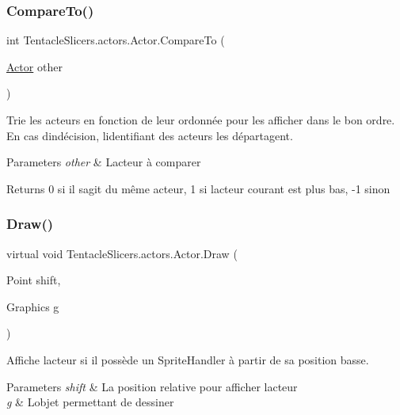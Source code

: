 \subsubsection{\texorpdfstring{Compare\+To()}{CompareTo()}}
{\footnotesize\ttfamily int Tentacle\+Slicers.\+actors.\+Actor.\+Compare\+To (\begin{DoxyParamCaption}\item[{\hyperlink{class_tentacle_slicers_1_1actors_1_1_actor}{Actor}}]{other }\end{DoxyParamCaption})}



Trie les acteurs en fonction de leur ordonnée pour les afficher dans le bon ordre. En cas d\textquotesingle{}indécision, l\textquotesingle{}identifiant des acteurs les départagent. 


\begin{DoxyParams}{Parameters}
{\em other} & L\textquotesingle{}acteur à comparer \\
\hline
\end{DoxyParams}
\begin{DoxyReturn}{Returns}
0 si il s\textquotesingle{}agit du même acteur, 1 si l\textquotesingle{}acteur courant est plus bas, -\/1 sinon 
\end{DoxyReturn}
\mbox{\label{class_tentacle_slicers_1_1actors_1_1_actor_ae06facc411c8cd44596e59020d131dd7}} 
\subsubsection{\texorpdfstring{Draw()}{Draw()}}
{\footnotesize\ttfamily virtual void Tentacle\+Slicers.\+actors.\+Actor.\+Draw (\begin{DoxyParamCaption}\item[{Point}]{shift,  }\item[{Graphics}]{g }\end{DoxyParamCaption})\hspace{0.3cm}{\ttfamily [virtual]}}



Affiche l\textquotesingle{}acteur si il possède un Sprite\+Handler à partir de sa position basse. 


\begin{DoxyParams}{Parameters}
{\em shift} & La position relative pour afficher l\textquotesingle{}acteur \\
\hline
{\em g} & L\textquotesingle{}objet permettant de dessiner \\
\hline
\end{DoxyParams}


